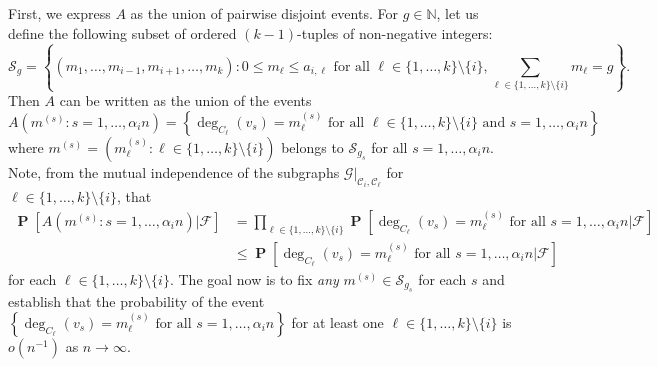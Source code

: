 \documentclass[11pt,reqno]{amsart}
\theoremstyle{definition}
\theoremstyle{remark}
\theoremstyle{conjecture}
\DeclareMathOperator{\Prob}{\mathbf{P}}
\begin{document}
First, we express $A$ as the union of pairwise disjoint events. For $g \in \mathbb{N}$, let us define the following subset of ordered $(k-1)$-tuples of non-negative integers:
\begin{equation}
\mathcal{S}_{g} = \left\{\left(m_{1}, \ldots, m_{i-1}, m_{i+1}, \ldots, m_{k}\right): 0 \leqslant m_{\ell} \leqslant a_{i,\ell} \text{ for all } \ell \in \{1, \ldots, k\} \setminus \{i\}, \sum_{\ell \in \{1, \ldots, k\} \setminus \{i\}} m_{\ell} = g\right\}. \nonumber
\end{equation} 
Then $A$ can be written as the union of the events
\begin{equation}
A\left(m^{(s)}: s = 1, \ldots, \alpha_{i} n\right) = \left\{\deg_{C_{\ell}}(v_{s}) = m^{(s)}_{\ell} \text{ for all } \ell \in \{1, \ldots, k\} \setminus \{i\} \text{ and } s = 1, \ldots, \alpha_{i} n\right\} \nonumber
\end{equation}
where $m^{(s)} = \left(m^{(s)}_{\ell}: \ell \in \{1, \ldots, k\} \setminus \{i\}\right)$ belongs to $\mathcal{S}_{g_{s}}$ for all $s = 1, \ldots, \alpha_{i} n$. Note, from the mutual independence of the subgraphs $\mathcal{G}|_{\mathcal{C}_{i}, \mathcal{C}_{\ell}}$ for $\ell \in \{1, \ldots, k\} \setminus \{i\}$, that 
\begin{align}\label{independence}
\Prob\left[A\left(m^{(s)}: s = 1, \ldots, \alpha_{i} n\right)\Big|\mathcal{F}\right] &= \prod_{\ell \in \{1, \ldots, k\} \setminus \{i\}} \Prob\left[\deg_{C_{\ell}}(v_{s}) = m^{(s)}_{\ell} \text{ for all } s = 1, \ldots, \alpha_{i} n\Big|\mathcal{F}\right] \nonumber\\
&\leqslant \Prob\left[\deg_{C_{\ell}}(v_{s}) = m^{(s)}_{\ell} \text{ for all } s = 1, \ldots, \alpha_{i} n\Big|\mathcal{F}\right]
\end{align}
for each $\ell \in \{1, \ldots, k\} \setminus \{i\}$. The goal now is to fix \emph{any} $m^{(s)} \in \mathcal{S}_{g_{s}}$ for each $s$ and establish that the probability of the event $\left\{\deg_{C_{\ell}}(v_{s}) = m^{(s)}_{\ell} \text{ for all } s = 1, \ldots, \alpha_{i} n\right\}$ for at least one $\ell \in \{1, \ldots, k\} \setminus \{i\}$ is $o(n^{-1})$ as $n \rightarrow \infty$. 

\end{document}
